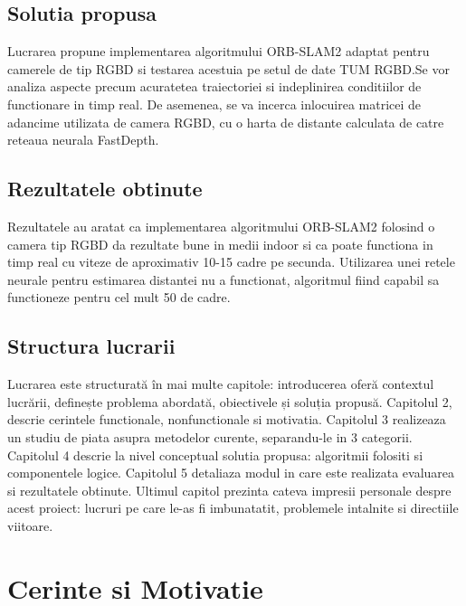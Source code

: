 \documentclass[12pt,a4paper]{report}
\begin{document}
\section{Solutia propusa}
Lucrarea propune implementarea algoritmului ORB-SLAM2 adaptat pentru camerele de tip RGBD
si testarea acestuia pe setul de date TUM RGBD.\@ Se vor analiza aspecte precum acuratetea 
traiectoriei si indeplinirea conditiilor de functionare in timp real. De asemenea, se va 
incerca inlocuirea matricei de adancime utilizata de camera RGBD, cu o harta de distante 
calculata de catre reteaua neurala FastDepth.  

\section{Rezultatele obtinute}
Rezultatele au aratat ca implementarea algoritmului ORB-SLAM2 folosind o camera tip RGBD 
da rezultate bune in medii indoor si ca poate functiona in timp real cu viteze de aproximativ
10{-}15 cadre pe secunda. Utilizarea unei retele neurale pentru estimarea distantei nu a 
functionat, algoritmul fiind capabil sa functioneze pentru cel mult 50 de cadre.  

\section{Structura lucrarii}
Lucrarea este structurată în mai multe capitole: introducerea oferă contextul lucrării,
definește problema abordată, obiectivele și soluția propusă. Capitolul 2, descrie 
cerintele functionale, nonfunctionale si motivatia.
Capitolul 3 realizeaza un studiu de piata asupra metodelor curente, separandu-le in 3
categorii. Capitolul 4 descrie la nivel conceptual solutia propusa: algoritmii folositi si componentele logice.
Capitolul 5 detaliaza modul in care este realizata evaluarea si rezultatele obtinute.
Ultimul capitol prezinta cateva impresii personale despre acest proiect: lucruri pe 
care le-as fi imbunatatit, problemele intalnite si directiile viitoare. 

\chapter{Cerinte si Motivatie}
\end{document}
